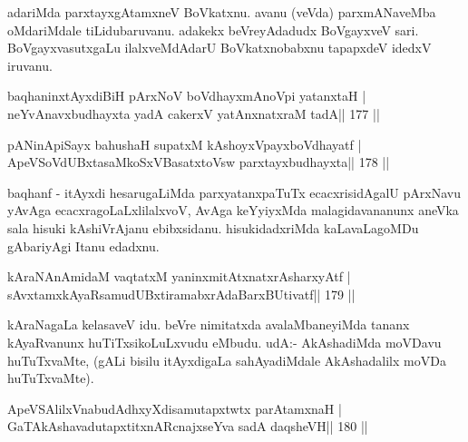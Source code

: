\begin{artha}
adariMda parxtayxgAtamxneV BoVkatxnu. avanu (veVda) parxmANaveMba  oMdariMdale tiLidubaruvanu. adakekx beVreyAdadudx BoVgayxveV sari. BoVgayxvasutxgaLu ilalxveMdAdarU BoVkatxnobabxnu tapapxdeV idedxV iruvanu.
\end{artha}

\begin{shl}
baqhaninxtAyxdiBiH pArxNoV boVdhayxmAnoV\s pi yatanxtaH |
neYvAnavxbudhayxta yadA cakerxV yatAnxnatxraM tadA\hfill || 177 ||
\end{shl}

\begin{shl}
pANinA\s\s piSayx bahushaH supatxM kAshoyxV\s payxboVdhayatf |
ApeVSoVdUBxtasaMkoSxVBasatxtoV\s sw parxtayxbudhayxta\hfill || 178 ||
\end{shl}

\begin{artha}
baqhanf - itAyxdi hesarugaLiMda parxyatanxpaTuTx ecacxrisidAgalU  pArxNavu yAvAga ecacxragoLaLxlilalxvoV, AvAga keYyiyxMda  malagidavananunx aneVka sala hisuki kAshiVrAjanu ebibxsidanu.  hisukidadxriMda kaLavaLagoMDu gAbariyAgi Itanu edadxnu.
\end{artha}


\begin{shl}
kAraNAnAmidaM vaqtatxM yaninxmitAtxnatxrAsharxyAtf |
sAvxtamxkAyaRsamudUBxtiramabxrAdaBarxBUtivatf\hfill || 179 ||
\end{shl}

\begin{artha}
kAraNagaLa kelasaveV idu. beVre nimitatxda avalaMbaneyiMda tananx  kAyaRvanunx huTiTxsikoLuLxvudu eMbudu. udA:- AkAshadiMda moVDavu  huTuTxvaMte, (gALi bisilu itAyxdigaLa sahAyadiMdale AkAshadalilx moVDa huTuTxvaMte).
\end{artha}


\begin{shl}
ApeVSAlilxVnabudAdhxyXdisamutapxtwtx parAtamxnaH |
GaTAkAshavadutapxtitxnARcnajxseYva sadA daqsheVH\hfill || 180 ||
\end{shl}

